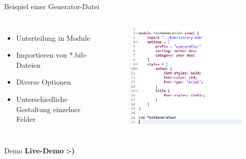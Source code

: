 \documentclass[fleqn,11pt,aspectratio=43]{beamer}
\begin{document}
\begin{frame}{Beispiel einer Generator-Datei}
\begin{columns}[t] 
\begin{itemize}
\item Unterteilung in Module
\item Importieren von *.bib-Dateien
\item Diverse Optionen 
\item Unterschiedliche Gestaltung einzelner Felder
\end{itemize}
\begin{figure}
\includegraphics[scale=0.6]{../ExampleHTMLGEN.png} 
\end{figure}
\end{columns}
   
\end{frame}

\begin{frame}{Demo}
\centering
\Huge
\textbf{Live-Demo :-)}
\end{frame}
\end{document}
